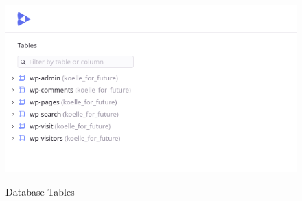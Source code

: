 \begin{figure}[H]
\centering
\caption {Database Tables}
\includegraphics[width=\linewidth]{images/tables.png}
\label{fig:tablesCount}
\end{figure}
